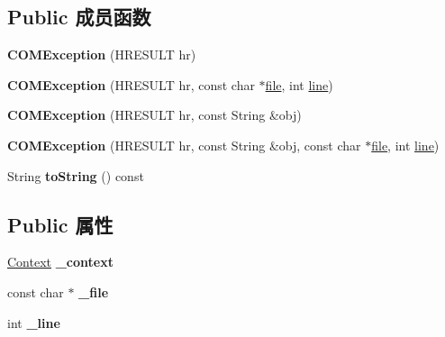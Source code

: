 \subsection*{Public 成员函数}
\begin{DoxyCompactItemize}
\item 
\mbox{\label{struct_c_o_m_exception_a9cb9d3289d2b50226a7b180fecebaca4}} 
{\bfseries C\+O\+M\+Exception} (H\+R\+E\+S\+U\+LT hr)
\item 
\mbox{\label{struct_c_o_m_exception_add103037a0f286d009fd4037182ed767}} 
{\bfseries C\+O\+M\+Exception} (H\+R\+E\+S\+U\+LT hr, const char $\ast$\hyperlink{structfile}{file}, int \hyperlink{structline}{line})
\item 
\mbox{\label{struct_c_o_m_exception_ad4ecc8315bbcbd5c679ee03a5e1b3055}} 
{\bfseries C\+O\+M\+Exception} (H\+R\+E\+S\+U\+LT hr, const String \&obj)
\item 
\mbox{\label{struct_c_o_m_exception_a6ca8fbe04141eb8f48077ced0e9229f5}} 
{\bfseries C\+O\+M\+Exception} (H\+R\+E\+S\+U\+LT hr, const String \&obj, const char $\ast$\hyperlink{structfile}{file}, int \hyperlink{structline}{line})
\item 
\mbox{\label{struct_c_o_m_exception_acc54f2fbe75f1a9884cbaf48b156e7b4}} 
String {\bfseries to\+String} () const
\end{DoxyCompactItemize}
\subsection*{Public 属性}
\begin{DoxyCompactItemize}
\item 
\mbox{\label{struct_c_o_m_exception_a4041038d8f8f033cf8176dc7b162abcd}} 
\hyperlink{struct_context}{Context} {\bfseries \+\_\+context}
\item 
\mbox{\label{struct_c_o_m_exception_a31dd0a49a0421e13d77ff525f4108aba}} 
const char $\ast$ {\bfseries \+\_\+file}
\item 
\mbox{\label{struct_c_o_m_exception_a1d295b400963c9d4e6cf026846d7193f}} 
int {\bfseries \+\_\+line}
\end{DoxyCompactItemize}
